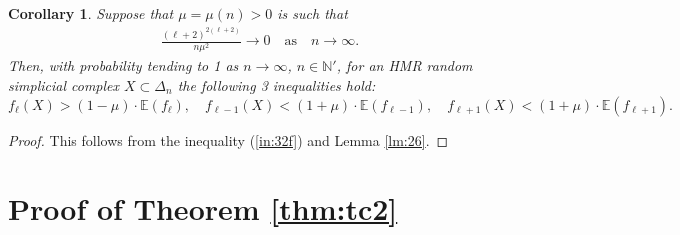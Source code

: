 \documentclass[10pt,a4paper]{amsart}
\newtheorem{corollary}[lema]{Corollary}
\newcommand{\N}{\mathbb{N}}
\newcommand{\E}{\mathbb{E}}
\begin{document}
\begin{corollary}\label{cor:27}
Suppose that $\mu=\mu(n)>0$ is such that 
\begin{eqnarray}\label{eq:38}
\frac{(\ell+2)^{2(\ell+2)}}{n \mu^2} \to 0\quad \mbox{as}\quad  n\to \infty.
 \end{eqnarray} 
 Then, with probability tending to 1 as 
$n\to \infty$, $n\in \N'$, 
for an HMR random simplicial complex $X\subset \Delta_n$ the following 3 inequalities hold:
$$
f_\ell(X)>(1-\mu)\cdot \E(f_\ell), \quad f_{\ell-1}(X)<(1+\mu)\cdot \E(f_{\ell-1}), \quad  f_{\ell+1}(X)<(1+\mu)\cdot \E(f_{\ell+1}). 
$$
\end{corollary}
\begin{proof}
This follows from the inequality (\ref{in:32f}) and Lemma \ref{lm:26}. 
\end{proof}

\section{Proof of Theorem \ref{thm:tc2}}\label{sec:9}
\end{document}
